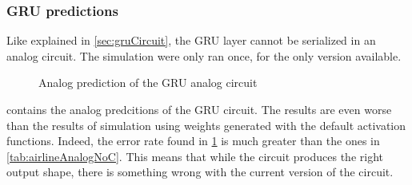 \subsubsection{\ac{GRU} predictions}

Like explained in \cref{sec:gruCircuit}, the \ac{GRU} layer cannot be serialized in an analog circuit. The simulation were only ran once, for the only version available.

\begin{figure}[H]
  \centering
  
  \caption{Analog prediction of the \ac{GRU} analog circuit}
  \label{graph:airlineAnalogGRU}
\end{figure}

 contains the analog predcitions of the \ac{GRU} circuit. The results are even worse than the results of simulation using weights generated with the default activation functions. Indeed, the error rate found in \cref{graph:airlineAnalogGRU} is much greater than the ones in \cref{tab:airlineAnalogNoC}. This means that while the circuit produces the right output shape, there is something wrong with the current version of the circuit.
